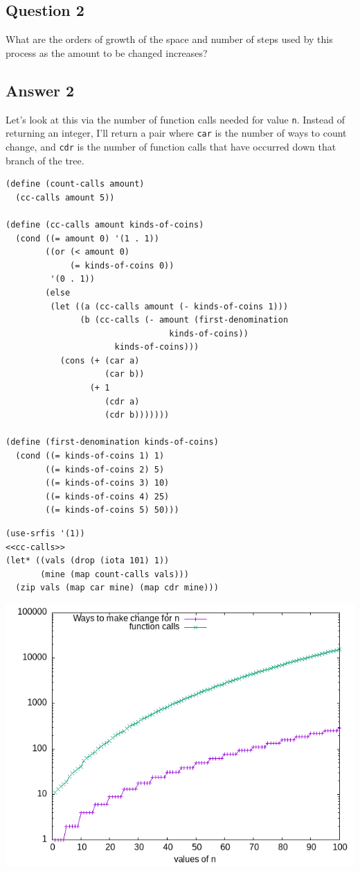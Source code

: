 \documentclass[final,fleqn,titlepage]{article}
\begin{document}
\subsection{Question 2}
\label{sec:org5ef7639}
What are the orders of growth of the space and number of steps used by this
process as the amount to be changed increases?

\subsection{Answer 2}
\label{sec:org28ac3d1}
Let's look at this via the number of function calls needed for value \texttt{n}. Instead
of returning an integer, I'll return a pair where \texttt{car} is the number of ways to
count change, and \texttt{cdr} is the number of function calls that have occurred down
that branch of the tree.

\begin{verbatim}
(define (count-calls amount)
  (cc-calls amount 5))

(define (cc-calls amount kinds-of-coins)
  (cond ((= amount 0) '(1 . 1))
        ((or (< amount 0)
             (= kinds-of-coins 0))
         '(0 . 1))
        (else
         (let ((a (cc-calls amount (- kinds-of-coins 1)))
               (b (cc-calls (- amount (first-denomination
                                 kinds-of-coins))
                      kinds-of-coins)))
           (cons (+ (car a)
                    (car b))
                 (+ 1
                    (cdr a)
                    (cdr b)))))))

(define (first-denomination kinds-of-coins)
  (cond ((= kinds-of-coins 1) 1)
        ((= kinds-of-coins 2) 5)
        ((= kinds-of-coins 3) 10)
        ((= kinds-of-coins 4) 25)
        ((= kinds-of-coins 5) 50)))
\end{verbatim}


\begin{verbatim}
(use-srfis '(1))
<<cc-calls>>
(let* ((vals (drop (iota 101) 1))
       (mine (map count-calls vals)))
  (zip vals (map car mine) (map cdr mine)))
\end{verbatim}

\begin{center}
\includegraphics[width=.9\linewidth]{fig/cc-100.png}
\end{center}
\end{document}
